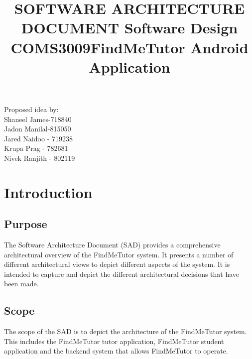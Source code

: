 \documentclass[12pt]{article}
\begin{document}
\title{\textbf{SOFTWARE ARCHITECTURE DOCUMENT }}
\maketitle

\begin{center}
\title{\textbf{Software Design COMS3009}}
\maketitle
\end{center}
\begin{center}
\title{\textbf{FindMeTutor Android Application}}
\maketitle
\end{center}

\begin{center}
Proposed idea by:\\
Shaneel James-718840
\\Jadon Manilal-815050
\\Jared Naidoo - 719238
\\Krupa Prag - 782681
\\Nivek Ranjith - 802119
\end{center}


\newpage
\tableofcontents
\newpage


\section{\textbf{Introduction}}
\subsection{Purpose}
The Software Architecture Document (SAD) provides a comprehensive architectural overview of the FindMeTutor system. It presents a number of different architectural views to depict different aspects of the system. It is intended to capture and depict the different architectural decisions that have been made.

\subsection{Scope}
The scope of the SAD is to depict the architecture of the FindMeTutor system. This includes the FindMeTutor tutor application, FindMeTutor student application and the backend system that allows FindMeTutor to operate.
\end{document}
